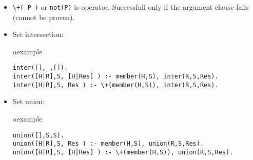 \begin{frame}[fragile]
\begin{itemize}
\item \lstinline!\+( P )!  or \lstinline!not(P)! is  operator. Successfull only if the argument clause fails (cannot be proven).
\item Set intersection:\\
\begin{beamercolorbox}{oexample}
\begin{lstlisting}[escapeinside=`']
inter([],_,[]).
inter([H|R],S, [H|Res] ) :- member(H,S), inter(R,S,Res).
inter([H|R],S, Res ) :- \+(member(H,S)), inter(R,S,Res).
\end{lstlisting}
\end{beamercolorbox}
\item Set union:\\
\begin{beamercolorbox}{oexample}
\begin{lstlisting}[escapeinside=`']
union([],S,S).
union([H|R],S, Res ) :- member(H,S), union(R,S,Res).
union([H|R],S, [H|Res] ) :- \+(member(H,S)), union(R,S,Res).
\end{lstlisting}
\end{beamercolorbox}
\end{itemize}
\end{frame}

